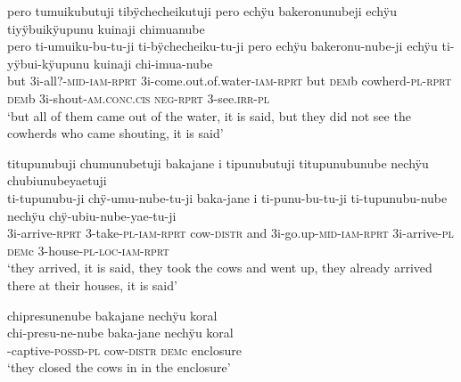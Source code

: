 \ea%
\begingl 
\glpreamble pero tumuikubutuji tibÿchecheikutuji pero echÿu bakeronunubeji echÿu tiyÿbuikÿupunu kuinaji chimuanube\\
\gla pero ti-umuiku-bu-tu-ji ti-bÿchecheiku-tu-ji pero echÿu bakeronu-nube-ji echÿu ti-yÿbui-kÿupunu kuinaji chi-imua-nube\\ 
\glb but 3i-all?-\textsc{mid}-\textsc{iam}-\textsc{rprt} 3i-come.out.of.water-\textsc{iam}-\textsc{rprt} but \textsc{dem}b cowherd-\textsc{pl}-\textsc{rprt} \textsc{dem}b 3i-shout-\textsc{am.conc.cis} \textsc{neg}-\textsc{rprt} 3-see.\textsc{irr}-\textsc{pl}\\ 
\glft ‘but all of them came out of the water, it is said, but they did not see the cowherds who came shouting, it is said’\\ 
\endgl
\xe


\ea%
\begingl 
\glpreamble titupunubuji chumunubetuji bakajane i tipunubutuji titupunubunube nechÿu chubiunubeyaetuji\\
\gla ti-tupunubu-ji chÿ-umu-nube-tu-ji baka-jane i ti-punu-bu-tu-ji ti-tupunubu-nube nechÿu chÿ-ubiu-nube-yae-tu-ji\\ 
\glb 3i-arrive-\textsc{rprt} 3-take-\textsc{pl}-\textsc{iam}-\textsc{rprt} cow-\textsc{distr} and 3i-go.up-\textsc{mid}-\textsc{iam}-\textsc{rprt} 3i-arrive-\textsc{pl} \textsc{dem}c 3-house-\textsc{pl}-\textsc{loc}-\textsc{iam}-\textsc{rprt}\\ 
\glft ‘they arrived, it is said, they took the cows and went up, they already arrived there at their houses, it is said’\\ 
\endgl
\xe

\newpage

\ea%
\begingl 
\glpreamble chipresunenube bakajane nechÿu koral\\
\gla chi-presu-ne-nube baka-jane nechÿu koral\\ 
-captive-\textsc{possd}-\textsc{pl} cow-\textsc{distr} \textsc{dem}c enclosure\\ 
\glft ‘they closed the cows in in the enclosure’\\ 
\endgl
\xe

